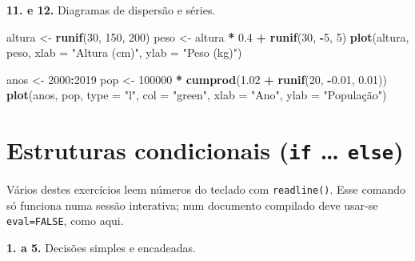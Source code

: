 \documentclass[
  portuguese,
  11pt,
  openany]{book}
\newenvironment{Shaded}{\begin{snugshade}}{\end{snugshade}}
\newcommand{\AttributeTok}[1]{\textcolor[rgb]{0.13,0.29,0.53}{#1}}
\newcommand{\DecValTok}[1]{\textcolor[rgb]{0.00,0.00,0.81}{#1}}
\newcommand{\FloatTok}[1]{\textcolor[rgb]{0.00,0.00,0.81}{#1}}
\newcommand{\FunctionTok}[1]{\textcolor[rgb]{0.13,0.29,0.53}{\textbf{#1}}}
\newcommand{\NormalTok}[1]{#1}
\newcommand{\OtherTok}[1]{\textcolor[rgb]{0.56,0.35,0.01}{#1}}
\newcommand{\SpecialCharTok}[1]{\textcolor[rgb]{0.81,0.36,0.00}{\textbf{#1}}}
\newcommand{\StringTok}[1]{\textcolor[rgb]{0.31,0.60,0.02}{#1}}
\begin{document}
\textbf{11. e 12.} Diagramas de dispersão e séries.

\begin{Shaded}
\begin{Highlighting}[]
\NormalTok{altura }\OtherTok{\textless{}{-}} \FunctionTok{runif}\NormalTok{(}\DecValTok{30}\NormalTok{, }\DecValTok{150}\NormalTok{, }\DecValTok{200}\NormalTok{)}
\NormalTok{peso }\OtherTok{\textless{}{-}}\NormalTok{ altura }\SpecialCharTok{*} \FloatTok{0.4} \SpecialCharTok{+} \FunctionTok{runif}\NormalTok{(}\DecValTok{30}\NormalTok{, }\SpecialCharTok{{-}}\DecValTok{5}\NormalTok{, }\DecValTok{5}\NormalTok{)}
\FunctionTok{plot}\NormalTok{(altura, peso, }\AttributeTok{xlab =} \StringTok{"Altura (cm)"}\NormalTok{, }\AttributeTok{ylab =} \StringTok{"Peso (kg)"}\NormalTok{)}

\NormalTok{anos }\OtherTok{\textless{}{-}} \DecValTok{2000}\SpecialCharTok{:}\DecValTok{2019}
\NormalTok{pop  }\OtherTok{\textless{}{-}} \DecValTok{100000} \SpecialCharTok{*} \FunctionTok{cumprod}\NormalTok{(}\FloatTok{1.02} \SpecialCharTok{+} \FunctionTok{runif}\NormalTok{(}\DecValTok{20}\NormalTok{, }\SpecialCharTok{{-}}\FloatTok{0.01}\NormalTok{, }\FloatTok{0.01}\NormalTok{))}
\FunctionTok{plot}\NormalTok{(anos, pop, }\AttributeTok{type =} \StringTok{"l"}\NormalTok{, }\AttributeTok{col =} \StringTok{"green"}\NormalTok{,}
     \AttributeTok{xlab =} \StringTok{"Ano"}\NormalTok{, }\AttributeTok{ylab =} \StringTok{"População"}\NormalTok{)}
\end{Highlighting}
\end{Shaded}

\section{\texorpdfstring{Estruturas condicionais (\texttt{if} \ldots{} \texttt{else})}{Estruturas condicionais (if \ldots{} else)}}\label{estruturas-condicionais-if-else}

Vários destes exercícios leem números do teclado com \texttt{readline()}. Esse comando
só funciona numa sessão interativa; num documento compilado deve usar-se
\texttt{eval=FALSE}, como aqui.

\textbf{1. a 5.} Decisões simples e encadeadas.
\end{document}
